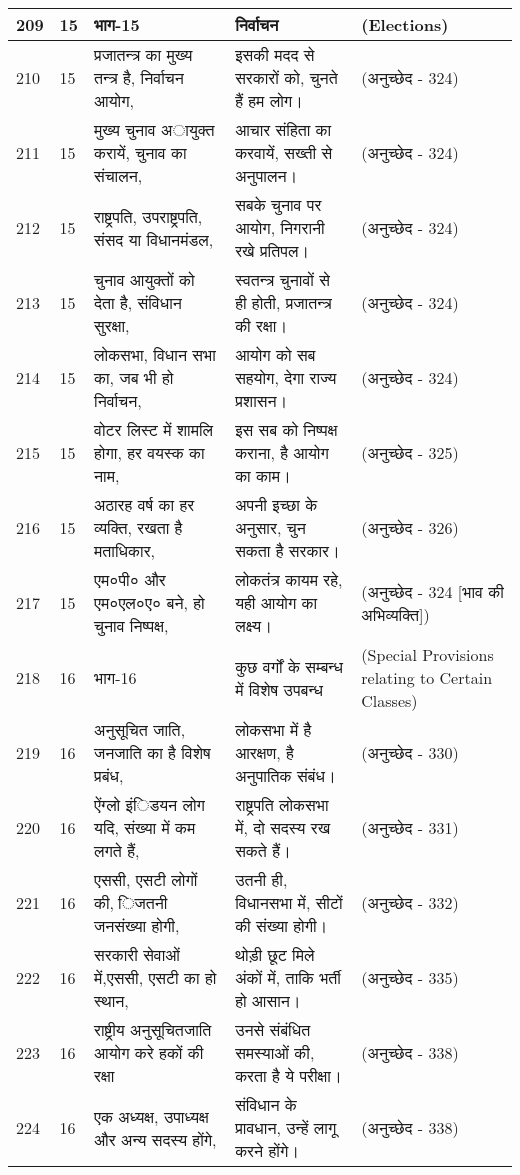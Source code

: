 \begin{longtable}{|l|l|l|l|l|}
209 & 15 & भाग-15 & निर्वाचन  & (Elections) \\ \hline 
210 & 15 & प्रजातन्त्र का मुख्य तन्त्र है, निर्वाचन आयोग, & इसकी मदद से सरकारों को, चुनते हैं हम लोग। & (अनुच्छेद - 324) \\ \hline 
211 & 15 & मुख्य चुनाव अायुक्त करायें, चुनाव का संचालन, & आचार संहिता का करवायें, सख्ती से अनुपालन। & (अनुच्छेद - 324) \\ \hline 
212 & 15 & राष्ट्रपति, उपराष्ट्रपति, संसद या विधानमंडल, & सबके चुनाव पर आयोग, निगरानी रखे प्रतिपल। & (अनुच्छेद - 324) \\ \hline 
213 & 15 & चुनाव आयुक्तों को देता है, संविधान सुरक्षा, & स्वतन्त्र चुनावों से ही होती, प्रजातन्त्र की रक्षा। & (अनुच्छेद - 324) \\ \hline 
214 & 15 & लोकसभा, विधान सभा का, जब भी हो निर्वाचन, & आयोग को सब सहयोग, देगा राज्य प्रशासन। & (अनुच्छेद - 324) \\ \hline 
215 & 15 & वोटर लिस्ट में शामलि होगा, हर वयस्क का नाम, & इस सब को निष्पक्ष कराना, है आयोग का काम। & (अनुच्छेद - 325) \\ \hline 
216 & 15 & अठारह वर्ष का हर व्यक्ति, रखता है मताधिकार, & अपनी इच्छा के अनुसार, चुन सकता है सरकार। & (अनुच्छेद - 326) \\ \hline 
217 & 15 & एम०पी० और एम०एल०ए० बने, हो चुनाव निष्पक्ष, & लोकतंत्र कायम रहे, यही आयोग का लक्ष्य। & (अनुच्छेद - 324 [भाव की अभिव्यक्ति]) \\ \hline 
218 & 16 & भाग-16 & कुछ वर्गों के सम्बन्ध में विशेष उपबन्ध & (Special Provisions relating to Certain Classes) \\ \hline 
219 & 16 & अनुसूचित जाति, जनजाति का है विशेष प्रबंध, & लोकसभा में है आरक्षण, है अनुपातिक संबंध। & (अनुच्छेद - 330) \\ \hline 
220 & 16 & ऐंग्लो इंिडयन लोग यदि, संख्या में कम लगते हैं, & राष्ट्रपति लोकसभा में, दो सदस्य रख सकते हैं। & (अनुच्छेद - 331) \\ \hline 
221 & 16 & एससी, एसटी लोगों की, िजतनी जनसंख्या होगी, & उतनी ही, विधानसभा में, सीटों की संख्या होगी। & (अनुच्छेद - 332) \\ \hline 
222 & 16 & सरकारी सेवाओं में,एससी, एसटी का हो स्थान, & थोड़ी छूट मिले अंकों में, ताकि भर्ती हो आसान। & (अनुच्छेद - 335) \\ \hline 
223 & 16 & राष्ट्रीय अनुसूचितजाति आयोग करे हकों की रक्षा & उनसे संबंधित समस्याओं की, करता है ये परीक्षा। & (अनुच्छेद - 338) \\ \hline 
224 & 16 & एक अध्यक्ष, उपाध्यक्ष और अन्य सदस्य होंगे, & संविधान के प्रावधान, उन्हें लागू करने होंगे। & (अनुच्छेद - 338) \\ \hline 

\end{longtable}
